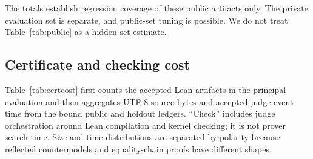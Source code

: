 \documentclass[10pt,twocolumn]{article}
\begin{document}
The totals establish regression coverage of these public artifacts only.  The
private evaluation set is separate, and public-set tuning is possible.  We do
not treat Table~\ref{tab:public} as a hidden-set estimate.

\subsection{Certificate and checking cost}

Table~\ref{tab:certcost} first counts the accepted Lean artifacts in the
principal evaluation and then aggregates UTF-8 source bytes and accepted
judge-event time from the bound public and holdout ledgers.  ``Check'' includes
judge orchestration around Lean compilation and kernel checking; it is not
prover search time.  Size and time distributions are separated by polarity
because reflected countermodels and equality-chain proofs have different
shapes.
\end{document}
